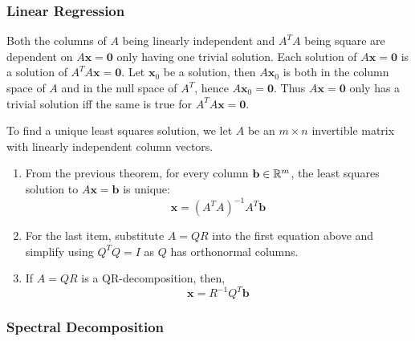 \subsubsection{Linear Regression}

{Both the columns of \(A\) being linearly independent and \(A^TA\) being square are dependent on \(A\mathbf{x} = \mathbf{0}\) only having one trivial solution. Each solution of \(A\mathbf{x} = \mathbf{0}\) is a solution of \(A^TA\mathbf{x} = \mathbf{0}\). Let \(\mathbf{x}_0\) be a solution, then \(A\mathbf{x}_0\) is both in the column space of \(A\) and in the null space of \(A^T\), hence \(A\mathbf{x}_0 = \mathbf{0}\). Thus \(A\mathbf{x} = \mathbf{0}\) only has a trivial solution iff the same is true for \(A^TA\mathbf{x} = \mathbf{0}\).}

To find a unique least squares solution, we let \(A\) be an \(m \times n\) invertible matrix with linearly independent column vectors.
\begin{enumerate}
    \item From the previous theorem, for every column \(\mathbf{b} \in \mathbb{R}^m\), the least squares solution to \(A\mathbf{x} = \mathbf{b}\) is unique:
    \begin{equation}
        \mathbf{x} = (A^TA)^{-1}A^T\mathbf{b}
    \end{equation}
    \item For the last item, substitute \(A=QR\) into the first equation above and simplify using \(Q^TQ = I\) as \(Q\) has orthonormal columns.
    \item If \(A=QR\) is a QR-decomposition, then,
    \begin{equation}
        \mathbf{x} = R^{-1}Q^T\mathbf{b}
    \end{equation}
\end{enumerate}

\subsubsection{Spectral Decomposition}